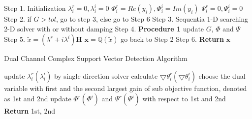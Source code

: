 \documentclass[12pt, draftclsnofoot, onecolumn]{IEEEtran}
\begin{document}
\begin{spacing}{2}
\begin{algorithm}[htb]
\begin{algorithmic}
\State Step 1. Initialization
\State $\lambda_{i}^{r}=0, \lambda_{i}^{i}=0$
\State $\Phi_{i}^{r}=Re(y_{i}), \Phi_{i}^{i}=Im(y_{i})$
\State $\Psi_{i}^{r}=0, \Psi_{i}^{i}=0$
\EndFor 
\State  Step 2. if $G>tol$, go to step 3, else go to Step 6
\State Step 3.
\State Sequentia 1-D searching 2-D solver with or without damping  
\State Step 4.
\State \textbf{Procedure 1} update $G$, $\Phi$ and $\Psi$
\State Step 5.
\State $\tilde{x}=(\lambda^{r}+i\lambda^{i})\mathbf{H}$ 
\State $\mathbf{x}=\mathbb{Q}(\tilde{x})$
\State go back to Step 2
\State Step 6. \textbf{Return} $\mathbf{x}$ 

\EndProcedure
\end{algorithmic}
\label{CSVD algorithm}
\caption{Dual Channel Complex Support Vector Detection Algorithm }
\end{algorithm}

\begin{algorithm}[htb]
\begin{algorithmic}
\State update $\lambda^{r}_{i}(\lambda_{i}^{i})$ by single direction solver
\State calculate $\bigtriangledown \theta^{r}_{i}(\bigtriangledown \theta_{i}^{i})$
\EndFor
\State choose the dual variable with first and the second largest gain of sub objective function, denoted as 1st and 2nd
\State update $\Phi^{r}(\Phi^{i})$ and $\Psi^{r}(\Psi^{i})$ with respect to 1st and 2nd
\State \textbf{Return} 1st, 2nd
\EndProcedure
\end{algorithmic}
\label{1D2D Nodamping}
\end{algorithm} 
 

\end{spacing}
\end{document}
